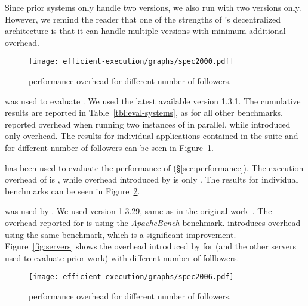 Since prior systems only handle two versions, we also run \varan with
two versions only.  However, we remind the reader that one of the
strengths of \varan's decentralized architecture is that it can handle
multiple versions with minimum additional overhead.

\begin{figure}[!t]
  \centering
  \texttt{[image: efficient-execution/graphs/spec2000.pdf]}
  \caption{\speczerozero performance overhead for different number of followers.}
  \label{fig:spec2000}
\end{figure}

\boldtext{\speczerozero} %
was used to evaluate \orchestra. We used the latest available version
1.3.1.  The cumulative results are reported in
Table~\ref{tbl:eval-systems}, as for all other benchmarks.  \orchestra
reported \orchestraSpec overhead when running two instances of
\speczerozero in parallel, while \nx introduced only
\speczerozeroOneFollower overhead. The results for individual
applications contained in the \speczerozero suite and for different
number of followers can be seen in Figure~\ref{fig:spec2000}.

\boldtext{\speczerosix} %
has been used to evaluate the performance of \mx (\S\ref{sec:performance}). The
execution overhead of \mx is \mxSpec, while overhead introduced by \nx is only
\speczerosixOneFollower. The results for individual benchmarks can be seen in
Figure~\ref{fig:spec2006}.


\boldtext{\httpd} %
was used by \orchestra.  We used version 1.3.29, same as in the
original work~\cite{orchestra09}.  The overhead reported for
\orchestra is \orchestraHttpd using the \emph{ApacheBench}
benchmark. \nx introduces \httpdAbOneFollower overhead using the same
benchmark, which is a significant improvement.
Figure~\ref{fig:servers} shows the overhead introduced by \varan for
\httpd (and the other servers used to evaluate prior work) with
different number of folllowers. 

\begin{figure}[!t]
 \centering
 \texttt{[image: efficient-execution/graphs/spec2006.pdf]}
 \caption{\speczerosix performance overhead for different number of followers.}
 \label{fig:spec2006}
\end{figure}

